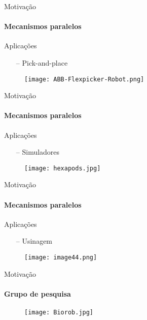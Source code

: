 \documentclass[25pt,landscape]{beamer}
\begin{document}
\begin{frame}{Motiva\c{c}\~ao}
    \framesubtitle{Mecanismos paralelos}
    \begin{block}{Aplica\c{c}\~oes}
        \begin{itemize}
            \item[--] Pick-and-place
        \end{itemize}
    \end{block}
    \begin{figure}[!h]
        \centering
        \texttt{[image: ABB-Flexpicker-Robot.png]}
    \end{figure}  
\end{frame}

\begin{frame}{Motiva\c{c}\~ao}
    \framesubtitle{Mecanismos paralelos}
    \begin{block}{Aplica\c{c}\~oes}
        \begin{itemize}
            \item[--] Simuladores
        \end{itemize}
    \end{block}
    \begin{figure}[!h]
        \centering
        \texttt{[image: hexapods.jpg]}
    \end{figure}  
\end{frame}

\begin{frame}{Motiva\c{c}\~ao}
    \framesubtitle{Mecanismos paralelos}
    \begin{block}{Aplica\c{c}\~oes}
        \begin{itemize}
            \item[--] Usinagem
        \end{itemize}
    \end{block}
    \begin{figure}[!h]
        \centering
        \texttt{[image: image44.png]}
    \end{figure}  
\end{frame}


\begin{frame}{Motiva\c{c}\~ao}
	\framesubtitle{Grupo de pesquisa}
	\pause
    \begin{figure}[!h]
        \centering
        \texttt{[image: Biorob.jpg]}
    \end{figure}
\end{frame}
\end{document}

